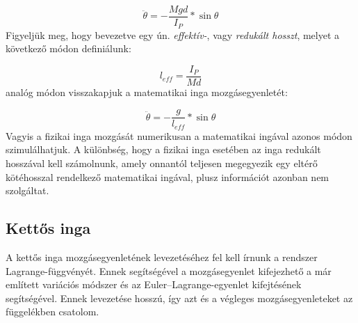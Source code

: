 \begin{multicols}{2}
\begin{equation}
    \ddot{\theta}
    =
    - \frac{M g d}{I_{P}} * \sin{\theta}
\end{equation}
Figyeljük meg, hogy bevezetve egy ún. \emph{effektív-}, vagy \emph{redukált hosszt}, melyet a következő módon definiálunk:

\begin{equation}
    l_{eff} = \frac{I_{P}}{M d}
\end{equation}
analóg módon visszakapjuk a matematikai inga mozgásegyenletét:

\begin{equation}
    \ddot{\theta}
    =
    - \frac{g}{l_{eff}} * \sin{\theta}
\end{equation}
Vagyis a fizikai inga mozgását numerikusan a matematikai ingával azonos módon szimulálhatjuk. A különbség, hogy a fizikai inga esetében az inga redukált hosszával kell számolnunk, amely onnantól teljesen megegyezik egy eltérő kötéhosszal rendelkező matematikai ingával, plusz információt azonban nem szolgáltat.

\subsection{Kettős inga} \label{sub:2.3}
A kettős inga mozgásegyenletének levezetéséhez fel kell írnunk a rendszer Lagrange-függvényét. Ennek segítségével a mozgásegyenlet kifejezhető a már említett variációs módszer és az Euler--Lagrange-egyenlet kifejtésének segítségével. Ennek levezetése hosszú, így azt és a végleges mozgásegyenleteket az  függelékben csatolom.


\end{multicols}
